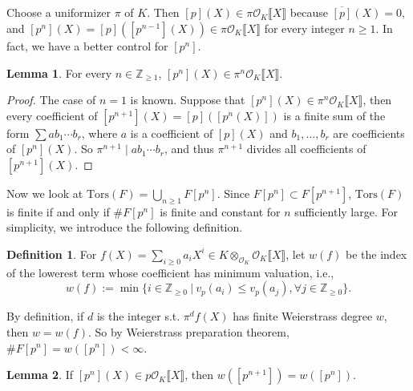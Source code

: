 \documentclass{article}
\theoremstyle{definition}
\newtheorem{definition}{Definition}
\newtheorem{lemma}{Lemma}
\theoremstyle{remark}
\newcommand{\Z}{\mathbb{Z}}
\renewcommand{\O}{\mathcal{O}}
\begin{document}
\subsection{}
Choose a uniformizer $\pi$ of $K$.
Then $[p](X)\in \pi\O_K\llbracket X\rrbracket$ because $\overline{[p]}(X) = 0$,
and $[p^n](X) = [p]([p^{n-1}](X))\in \pi\O_K\llbracket X\rrbracket$ for every integer $n\ge 1$.
In fact, we have a better control for $[p^n]$.
\begin{lemma}\label{p^n lies in pi^n if infinite height}
    For every $n\in\Z_{\ge 1}$, $[p^n](X)\in\pi^n\O_K\llbracket X\rrbracket$.
\end{lemma}
\begin{proof}
    The case of $n = 1$ is known.
    Suppose that $[p^{n}](X)\in\pi^{n}\O_K\llbracket X\rrbracket$,
    then every coefficient of $[p^{n + 1}](X) = [p]([p^{n}(X)])$ is a finite sum of the form $\sum ab_1\cdots b_r$,
    where $a$ is a coefficient of $[p](X)$ and $b_1, \dots, b_r$ are coefficients of $[p^n](X)$.
    So $\pi^{n + 1}\mid ab_1\cdots b_r$, and thus $\pi^{n + 1}$ divides all coefficients of $[p^{n+1}](X)$.
\end{proof}
Now we look at $\mathrm{Tors}(F) = \bigcup_{n\ge 1}F[p^n]$.
Since $F[p^n]\subset F[p^{n+1}]$, $\mathrm{Tors}(F)$ is finite if and only if $\# F[p^n]$ is finite and constant for $n$ sufficiently large.
For simplicity, we introduce the following definition.
\begin{definition}
    For $f(X) = \sum_{i\ge 0}a_iX^i\in K\otimes_{\O_K}\O_K\llbracket X\rrbracket$,
    let $w(f)$ be the index of the lowerest term whose coefficient has minimum valuation, i.e., \[w(f) := \min\{i\in\Z_{\ge 0}\ |\ v_p(a_i)\le v_p(a_j), \forall j\in\Z_{\ge 0}\}.\]
\end{definition}
By definition, if $d$ is the integer s.t. $\pi^d f(X)$ has finite Weierstrass degree $w$, then $w = w(f)$.
So by Weierstrass preparation theorem, $\# F[p^n] = w([p^n]) < \infty$.
\begin{lemma}\label{lowerest term cannot move right}
    If $[p^n](X)\in p\O_K\llbracket X\rrbracket$,
    then $w([p^{n+1}]) = w([p^n])$.
\end{lemma}
\end{document}
